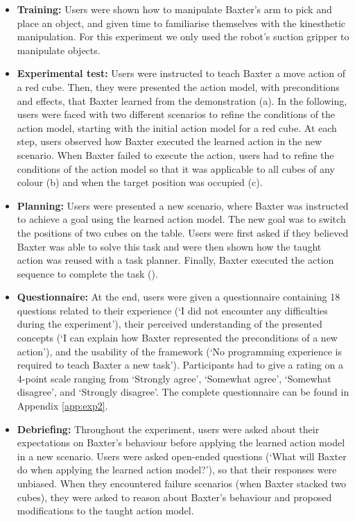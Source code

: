 \begin{itemize}
  \item{\textbf{Training:} Users were shown how to manipulate Baxter's arm to pick and place an object, and given time to familiarise themselves with the kinesthetic manipulation. 
  	For this experiment we only used the robot's suction gripper to manipulate objects.}
  \item{\textbf{Experimental test:} Users were instructed to teach Baxter a move action of a red cube. 
  	Then, they were presented the action model, with preconditions and effects, that Baxter learned from the demonstration (a). 
  	In the following, users were faced with two different scenarios to refine the conditions of the action model, starting with the initial action model for a red cube.
  	At each step, users observed how Baxter executed the learned action in the new scenario. 
  	When Baxter failed to execute the action, users had to refine the conditions of the action model so that it was applicable to all cubes of any colour (b) and when the target position was occupied (c).
  }
  \item{\textbf{Planning:} Users were presented a new scenario, where Baxter was instructed to achieve a goal using the learned action model. 
  	The new goal was to switch the positions of two cubes on the table. 
  	Users were first asked if they believed Baxter was able to solve this task and were then shown how the taught action was reused with a task planner.
  	Finally, Baxter executed the action sequence to complete the task ().}
  \item{\textbf{Questionnaire:} At the end, users were given a questionnaire containing 18 questions related to their experience (\eg `I did not encounter any difficulties during the experiment'), their perceived understanding of the presented concepts (\eg `I can explain how Baxter represented the preconditions of a new action'), and the usability of the framework (\eg `No programming experience is required to teach Baxter a new task').
  Participants had to give a rating on a 4-point scale ranging from `Strongly agree', `Somewhat agree', `Somewhat disagree', and `Strongly disagree'.
  The complete questionnaire can be found in Appendix \ref{app:exp2}.}
   \item{ \textbf{Debriefing:} Throughout the experiment, users were asked about their expectations on Baxter's behaviour before applying the learned action model in a new scenario. 
   	Users were asked open-ended questions (\eg `What will Baxter do when applying the learned action model?'), so that their responses were unbiased. 
   	When they encountered failure scenarios (\eg when Baxter stacked two cubes), they were asked to reason about Baxter's behaviour and proposed modifications to the taught action model.} 
\end{itemize}

